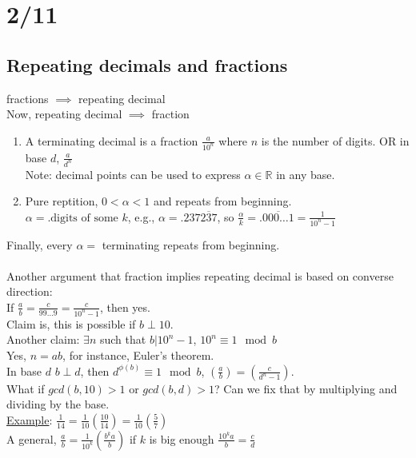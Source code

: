 \section*{2/11}
  \subsection*{Repeating decimals and fractions}
    fractions $\implies$ repeating decimal\\
    Now, repeating decimal $\implies$ fraction\\
    \begin{enumerate}
      \item A terminating decimal is a fraction $\frac{a}{10^n}$ where $n$ is
        the number of digits. OR in base $d$, $\frac{a}{d^n}$\\
        Note: decimal points can be used to express $\alpha \in \mathbb{R}$ in 
        any base.
      \item Pure reptition, $0 < \alpha < 1$ and repeats from beginning.\\
        $\alpha = .\text{digits of some $k$}$, e.g., $\alpha = 
        .237\overline{237}$, so $\frac{\alpha}{k} = .\overline{000\ldots 1} = 
        \frac{1}{10^n - 1}$
    \end{enumerate}
    Finally, every $\alpha = $ terminating repeats from beginning.\\\\
    Another argument that fraction implies repeating decimal is based on
    converse direction:\\
    If $\frac{a}{b} = \frac{c}{99\ldots9} = \frac{c}{10^n - 1}$, then yes.\\
    Claim is, this is possible if $b \perp 10$.\\
    Another claim: $\exists n$ such that $b | 10^n - 1$, $10^n \equiv 1 \mod 
    b$\\
    Yes, $n = ab$, for instance, Euler's theorem.\\
    In base $d$  $b \perp d$, then $d^{\phi(b)} \equiv 1 \mod b$,
      $(\frac{a}{b}) = (\frac{c}{d^n - 1})$.\\
    What if $gcd(b, 10) > 1$ or $gcd(b,d) > 1$? Can we fix that by multiplying
    and dividing by the base.\\
    \underline{Example}: $\frac{1}{14} = \frac{1}{10} (\frac{10}{14}) = 
      \frac{1}{10}(\frac{5}{7})$\\
    A general, $\frac{a}{b} = \frac{1}{10^k}(\frac{b^ka}{b})$ if $k$ is
    big enough $\frac{10^ka}{b} = \frac{c}{d}$\\

